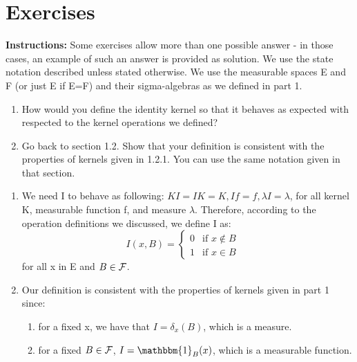 

\section{Exercises}

\textbf{Instructions:} Some exercises allow more than one possible answer - in those cases, an example of such an answer is provided as solution. We use the state notation described unless stated otherwise. We use the measurable spaces E and F (or just E if E=F) and their sigma-algebras as we defined in part 1.

\begin{Exercise}
\begin{enumerate}[label=(\alph*)]
\item How would you define the identity kernel so that it behaves as expected with respected to the kernel operations we defined? 
\item Go back to section 1.2. Show that your definition is consistent with the properties of kernels given in 1.2.1. You can use the same notation given in that section.
\end{enumerate}
\end{Exercise}
\begin{Answer}
\begin{enumerate}[label=(\alph*)]
\item We need I to behave as following: $ KI = IK = K, If = f, \lambda I = \lambda $, for all kernel K, measurable function f, and measure $\lambda$. Therefore, according to the operation definitions we discussed, we define I as:
\begin{equation*}
I(x, B) = \begin{cases}
             0  & \text{if } x \not \in B \\
             1  & \text{if } x \in B
       \end{cases} \quad
\end{equation*} for all x in E and $B \in \mathcal{F}$.


\item Our definition is consistent with the properties of kernels given in part 1 since:
\begin{enumerate}[label=(\roman*)]
\item for a fixed x, we have that $I = \delta_x(B)$, which is a measure.
\item for a fixed $B \in \mathcal{F}$, $I = \mathbbm{1}_B(x)$, which is a measurable function.
\end{enumerate}
\end{enumerate}
\end{Answer}


